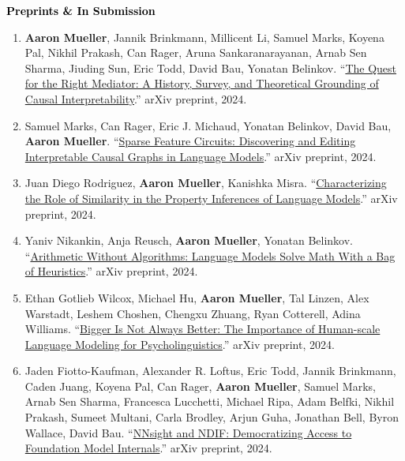 \documentclass[10pt]{article}
\renewcommand{\subsection}[1]{\textcolor{black}{#1}}
\providecommand*\titlelink[2]{\href{#1}{\textcolor{accent}{#2}}}
\begin{document}
	\subsection{\textbf{Preprints \& In Submission}}
	\begin{enumerate}[resume, leftmargin=*, topsep=0pt, itemsep=0.25ex, partopsep=0ex, parsep=1ex]

	\item \textbf{Aaron Mueller}, Jannik Brinkmann, Millicent Li, Samuel Marks, Koyena Pal, Nikhil Prakash, Can Rager, Aruna Sankaranarayanan, Arnab Sen Sharma, Jiuding Sun, Eric Todd, David Bau, Yonatan Belinkov. ``\titlelink{https://arxiv.org/abs/2407.04690v1}{The Quest for the Right Mediator: A History, Survey, and Theoretical Grounding of Causal Interpretability}.'' arXiv preprint, 2024.

	\item Samuel Marks, Can Rager, Eric J. Michaud, Yonatan Belinkov, David Bau, \textbf{Aaron Mueller}. ``\titlelink{https://arxiv.org/abs/2403.19647}{Sparse Feature Circuits: Discovering and Editing Interpretable Causal Graphs in Language Models}.'' arXiv preprint, 2024.\label{pub:feature-circuits}
	
	\item Juan Diego Rodriguez, \textbf{Aaron Mueller}, Kanishka Misra. ``\titlelink{https://arxiv.org/abs/2410.22590v1}{Characterizing the Role of Similarity in the Property Inferences of Language Models}.'' arXiv preprint, 2024.\label{pub:property-inferences}
	
	\item Yaniv Nikankin, Anja Reusch, \textbf{Aaron Mueller}, Yonatan Belinkov. ``\titlelink{https://arxiv.org/abs/2410.21272}{Arithmetic Without Algorithms: Language Models Solve Math With a Bag of Heuristics}.'' arXiv preprint, 2024.\label{pub:math-boh}
	
	\item Ethan Gotlieb Wilcox, Michael Hu, \textbf{Aaron Mueller}, Tal Linzen, Alex Warstadt, Leshem Choshen, Chengxu Zhuang, Ryan Cotterell, Adina Williams. ``\titlelink{https://osf.io/preprints/psyarxiv/rfwgd}{Bigger Is Not Always Better: The Importance of Human-scale Language Modeling for Psycholinguistics}.'' arXiv preprint, 2024.
	
	\item Jaden Fiotto-Kaufman, Alexander R. Loftus, Eric Todd, Jannik Brinkmann, Caden Juang, Koyena Pal, Can Rager, \textbf{Aaron Mueller}, Samuel Marks, Arnab Sen Sharma, Francesca Lucchetti, Michael Ripa, Adam Belfki, Nikhil Prakash, Sumeet Multani, Carla Brodley, Arjun Guha, Jonathan Bell, Byron Wallace, David Bau. ``\titlelink{https://arxiv.org/abs/2407.14561v1}{NNsight and NDIF: Democratizing Access to Foundation Model Internals}.'' arXiv preprint, 2024.

	\end{enumerate}
\end{document}
